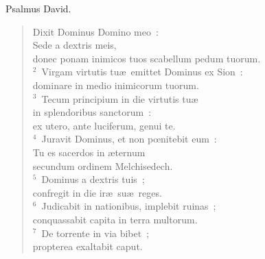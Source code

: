 \lettrine[lines=3,image=true,loversize=0.05,lraise=-0.03]{P}{}salmus David. \begin{flushleft}\begin{verse}\vspace{6pt}Dixit Dominus Domino meo~:\\ Sede a dextris meis,\\ donec ponam inimicos tuos scabellum pedum tuorum.\\
${}^{2}$~Virgam virtutis tu\ae\ emittet Dominus ex Sion~:\\ dominare in medio inimicorum tuorum.\\
${}^{3}$~Tecum principium in die virtutis tu\ae \\ in splendoribus sanctorum~:\\ ex utero, ante luciferum, genui te.\\
${}^{4}$~Juravit Dominus, et non pœnitebit eum~:\\ Tu es sacerdos in \ae ternum\\ secundum ordinem Melchisedech.\\
${}^{5}$~Dominus a dextris tuis~;\\ confregit in die ir\ae\ su\ae\ reges.\\
${}^{6}$~Judicabit in nationibus, implebit ruinas~;\\ conquassabit capita in terra multorum.\\
${}^{7}$~De torrente in via bibet~;\\ propterea exaltabit caput.\end{verse}\end{flushleft}



